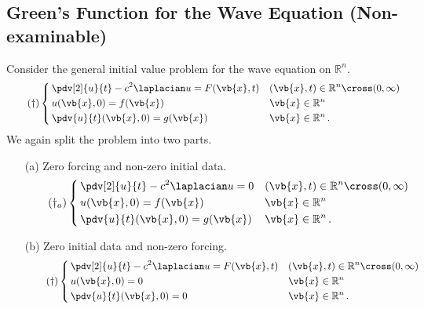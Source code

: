 \documentclass{article}
\theoremstyle{plain}\theoremheaderfont{\normalfont\itshape}\theorembodyfont{\rmfamily}\theoremseparator{.}\newtheorem*{rem}{Remark}\newtheorem*{ex}{Example}\newtheorem*{proof}{Proof}\newtheorem*{altp}{Alternative proof}
\theoremstyle{plain}\theoremheaderfont{\normalfont\bfseries}\theorembodyfont{\rmfamily}\theoremseparator{.}\newtheorem{thm}{Theorem}[section]\newtheorem{lem}[thm]{Lemma}\newtheorem{prop}[thm]{Proposition}\newtheorem*{cor}{Corollary}\newtheorem{defn}[thm]{Definition}\newtheorem{clm}[thm]{Claim}\newtheorem{clminproof}{Claim}
\theoremstyle{break}\theoremheaderfont{\normalfont\itshape}\theorembodyfont{\rmfamily}\theoremseparator{.\medskip}\newtheorem*{proofskip}{Proof}\newtheorem*{exs}{Examples}\newtheorem*{rems}{Remarks}
\theoremstyle{break}\theoremheaderfont{\normalfont\bfseries}\theorembodyfont{\rmfamily}\theoremseparator{.\medskip}\newtheorem{lemskip}[thm]{Lemma}\newtheorem{defnskip}[thm]{Definition}\newtheorem{propskip}[thm]{Proposition}\newtheorem{thmskip}[thm]{Theorem}
\numberwithin{equation}{section}
\begin{document}
	\subsection{Green's Function for the Wave Equation (Non-examinable)}
	Consider the general initial value problem for the wave equation on \(\mathbb{R}^n\).
	\begin{equation}\tag{\(\dagger\)}
		\left\{\begin{aligned}
			&\,\pdv[2]{u}{t}-c^2\laplacian u=F(\vb{x},t) && (\vb{x},t)\in\mathbb{R}^n\cross(0,\infty)\\
			&\,u(\vb{x},0)=f(\vb{x}) && \vb{x}\in\mathbb{R}^n\\
			&\,\pdv{u}{t}(\vb{x},0)=g(\vb{x}) && \vb{x}\in\mathbb{R}^n\,.
		\end{aligned}\right.
	\end{equation}
	We again split the problem into two parts.
	\begin{itemize}[topsep=0pt]
		\item[(a)] Zero forcing and non-zero initial data.
		\begin{equation}\tag{\(\dagger_a\)}
			\left\{\begin{aligned}
				&\,\pdv[2]{u}{t}-c^2\laplacian u=0 && (\vb{x},t)\in\mathbb{R}^n\cross(0,\infty)\\
				&\,u(\vb{x},0)=f(\vb{x}) && \vb{x}\in\mathbb{R}^n\\
				&\,\pdv{u}{t}(\vb{x},0)=g(\vb{x}) && \vb{x}\in\mathbb{R}^n\,.
			\end{aligned}\right.
		\end{equation}
		\item[(b)] Zero initial data and non-zero forcing.
		\begin{equation}\tag{\(\dagger\)}
			\left\{\begin{aligned}
				&\,\pdv[2]{u}{t}-c^2\laplacian u=F(\vb{x},t) && (\vb{x},t)\in\mathbb{R}^n\cross(0,\infty)\\
				&\,u(\vb{x},0)=0 && \vb{x}\in\mathbb{R}^n\\
				&\,\pdv{u}{t}(\vb{x},0)=0 && \vb{x}\in\mathbb{R}^n\,.
			\end{aligned}\right.
		\end{equation}
	\end{itemize}
\end{document}
